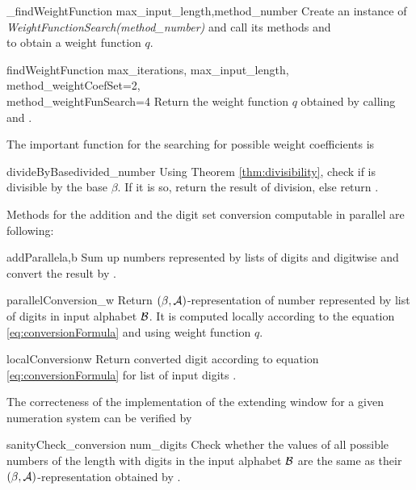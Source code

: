 \begin{method}{\_findWeightFunction}{ max\_input\_length,method\_number}
Create an instance of \emph{WeightFunctionSearch(method\_number)} and call its methods  and \\  to obtain a weight function $q$.
\end{method}


\begin{method}{findWeightFunction}{ max\_iterations, max\_input\_length, method\_weightCoefSet=2,\\ method\_weightFunSearch=4}
Return the weight function $q$ obtained by calling  and .
\end{method}

The important function for the searching for possible weight coefficients is

\begin{method}{divideByBase}{divided\_number}
Using Theorem \ref{thm:divisibility}, check if  is divisible by the base $\beta$. If it is so, return the result of division, else return .
\end{method}


Methods for the addition and the digit set conversion computable in parallel are following:

\begin{method}{addParallel}{a,b}
Sum up numbers represented by lists of digits  and  digitwise and convert the result by . 
\end{method}


\begin{method}{parallelConversion}{\_w}
Return $(\beta,\mathcal{A})$-representation of number represented by list  of digits in input alphabet $\mathcal{B}$. It is computed locally according to the equation \eqref{eq:conversionFormula} and using weight function $q$.
\end{method}


\begin{method}{localConversion}{w}
Return converted digit according to equation \eqref{eq:conversionFormula} for list of input digits .
\end{method}


The correcteness of the implementation of the extending window for a given numeration system can be verified by
 
\begin{method}{sanityCheck\_conversion}{ num\_digits}
Check whether the values of all possible numbers of the length  with digits in the input alphabet $\mathcal{B}$ are the same as their $(\beta, \mathcal{A})$-representation obtained by .   
\end{method}


